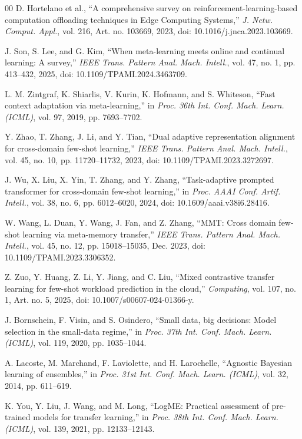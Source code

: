\documentclass[a4paper,fleqn]{cas-sc}
\begin{document}
\begin{thebibliography}{00}
 D. Hortelano et al.,
``A comprehensive survey on reinforcement-learning-based computation
offloading techniques in Edge Computing Systems,''
\emph{J. Netw. Comput. Appl.}, vol. 216,
Art. no. 103669, 2023, doi: 10.1016/j.jnca.2023.103669.

 J. Son, S. Lee, and G. Kim, ``When meta-learning meets online and continual learning: A survey,'' \emph{IEEE Trans. Pattern Anal. Mach. Intell.}, vol. 47, no. 1, pp. 413--432, 2025, doi: 10.1109/TPAMI.2024.3463709.

 L. M. Zintgraf, K. Shiarlis, V. Kurin, K. Hofmann, and S. Whiteson, ``Fast context adaptation via meta-learning,'' in \emph{Proc. 36th Int. Conf. Mach. Learn. (ICML)}, vol. 97, 2019, pp. 7693--7702.

 Y. Zhao, T. Zhang, J. Li, and Y. Tian, ``Dual adaptive representation alignment for cross-domain few-shot learning,'' \emph{IEEE Trans. Pattern Anal. Mach. Intell.}, vol. 45, no. 10, pp. 11720--11732, 2023, doi: 10.1109/TPAMI.2023.3272697.

 J. Wu, X. Liu, X. Yin, T. Zhang, and Y. Zhang, ``Task-adaptive prompted transformer for cross-domain few-shot learning,'' in \emph{Proc. AAAI Conf. Artif. Intell.}, vol. 38, no. 6, pp. 6012--6020, 2024, doi: 10.1609/aaai.v38i6.28416.

 W. Wang, L. Duan, Y. Wang, J. Fan, and Z. Zhang, ``MMT: Cross domain few-shot learning via meta-memory transfer,'' \emph{IEEE Trans. Pattern Anal. Mach. Intell.}, vol. 45, no. 12, pp. 15018--15035, Dec. 2023, doi: 10.1109/TPAMI.2023.3306352.

 Z. Zuo, Y. Huang, Z. Li, Y. Jiang, and C. Liu, ``Mixed contrastive transfer learning for few-shot workload prediction in the cloud,'' \emph{Computing}, vol. 107, no. 1, Art. no. 5, 2025, doi: 10.1007/s00607-024-01366-y.

J. Bornschein, F. Visin, and S. Osindero,
``Small data, big decisions: Model selection in the small-data regime,''
in \emph{Proc. 37th Int. Conf. Mach. Learn. (ICML)},
vol. 119, 2020, pp. 1035--1044.

A. Lacoste, M. Marchand, F. Laviolette, and H. Larochelle,
``Agnostic Bayesian learning of ensembles,''
in \emph{Proc. 31st Int. Conf. Mach. Learn. (ICML)},
vol. 32, 2014, pp. 611--619.

K. You, Y. Liu, J. Wang, and M. Long,
``LogME: Practical assessment of pre-trained models for transfer learning,''
in \emph{Proc. 38th Int. Conf. Mach. Learn. (ICML)},
vol. 139, 2021, pp. 12133--12143.


\end{thebibliography}
\end{document}
